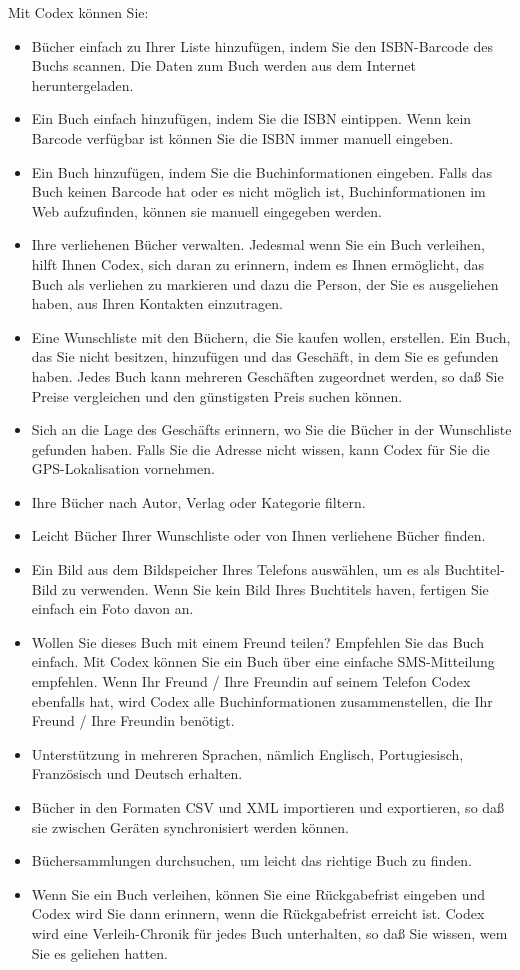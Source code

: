 Mit Codex können Sie:
\begin{itemize}
	\item Bücher einfach zu Ihrer Liste hinzufügen, indem Sie den ISBN-Barcode des Buchs scannen. Die Daten zum Buch werden aus dem Internet heruntergeladen.
	\item Ein Buch einfach hinzufügen, indem Sie die ISBN eintippen. Wenn kein Barcode verfügbar ist können Sie die ISBN immer manuell eingeben.
	\item Ein Buch hinzufügen, indem Sie die Buchinformationen eingeben. Falls das Buch keinen Barcode hat oder es nicht möglich ist, Buchinformationen im Web aufzufinden, können sie manuell eingegeben werden.
	\item Ihre verliehenen Bücher verwalten. Jedesmal wenn Sie ein Buch verleihen, hilft Ihnen Codex, sich daran zu erinnern, indem es Ihnen ermöglicht, das Buch als verliehen zu markieren und dazu die Person, der Sie es ausgeliehen haben, aus Ihren Kontakten einzutragen.
	\item Eine Wunschliste mit den Büchern, die Sie kaufen wollen, erstellen. Ein Buch, das Sie nicht besitzen, hinzufügen und das Geschäft, in dem Sie es gefunden haben. Jedes Buch kann mehreren Geschäften zugeordnet werden, so daß Sie Preise vergleichen und den günstigsten Preis suchen können.
	\item Sich an die Lage des Geschäfts erinnern, wo Sie die Bücher in der Wunschliste gefunden haben. Falls Sie die Adresse nicht wissen, kann Codex für Sie die GPS-Lokalisation vornehmen.
	\item Ihre Bücher nach Autor, Verlag oder Kategorie filtern.
	\item Leicht Bücher Ihrer Wunschliste oder von Ihnen verliehene Bücher finden.
	\item Ein Bild aus dem Bildspeicher Ihres Telefons auswählen, um es als Buchtitel-Bild zu verwenden. Wenn Sie kein Bild Ihres Buchtitels haven, fertigen Sie einfach ein Foto davon an.
	\item Wollen Sie dieses Buch mit einem Freund teilen? Empfehlen Sie das Buch einfach. Mit Codex können Sie ein Buch über eine einfache SMS-Mitteilung empfehlen. Wenn Ihr Freund / Ihre Freundin auf seinem Telefon Codex ebenfalls hat, wird Codex alle Buchinformationen zusammenstellen, die Ihr Freund / Ihre Freundin benötigt.
	\item Unterstützung in mehreren Sprachen, nämlich Englisch, Portugiesisch, Französisch und Deutsch erhalten.
	\item Bücher in den Formaten CSV und XML importieren und exportieren, so daß sie zwischen Geräten synchronisiert werden können.
	\item Büchersammlungen durchsuchen, um leicht das richtige Buch zu finden.
	\item Wenn Sie ein Buch verleihen, können Sie eine Rückgabefrist eingeben und Codex wird Sie dann erinnern, wenn die Rückgabefrist erreicht ist. Codex wird eine Verleih-Chronik für jedes Buch unterhalten, so daß Sie wissen, wem Sie es geliehen hatten.
\end{itemize}

